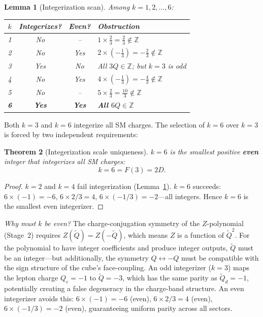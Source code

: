 \documentclass[11pt,a4paper]{article}
\newtheorem{theorem}{Theorem}[section]
\newtheorem{lemma}[theorem]{Lemma}
\theoremstyle{definition}
\theoremstyle{remark}
\newcommand{\tildeQ}{\tilde{Q}}
\newcommand{\Zidx}{Z}
\begin{document}
\begin{lemma}[Integerization scan]
\label{lem:int_scan}
Among $k = 1, 2, \ldots, 6$:
\begin{center}
\begin{tabular}{cccl}
\toprule
$k$ & Integerizes? & Even? & Obstruction \\
\midrule
1 & No & -- & $1 \times \tfrac{2}{3} = \tfrac{2}{3} \notin \mathbb{Z}$ \\
2 & No & Yes & $2 \times (-\tfrac{1}{3}) = -\tfrac{2}{3} \notin \mathbb{Z}$ \\
3 & Yes & No & All $3Q \in \mathbb{Z}$; but $k = 3$ is odd \\
4 & No & Yes & $4 \times (-\tfrac{1}{3}) = -\tfrac{4}{3} \notin \mathbb{Z}$ \\
5 & No & -- & $5 \times \tfrac{2}{3} = \tfrac{10}{3} \notin \mathbb{Z}$ \\
\textbf{6} & \textbf{Yes} & \textbf{Yes} & \textbf{All $6Q \in \mathbb{Z}$} \\
\bottomrule
\end{tabular}
\end{center}
\end{lemma}

\noindent
Both $k = 3$ and $k = 6$ integerize all SM charges.  The selection of $k = 6$
over $k = 3$ is forced by two independent requirements:

\begin{theorem}[Integerization scale uniqueness]
\label{thm:k_eq_6}
$k = 6$ is the smallest positive \textbf{even} integer that integerizes all SM
charges:
\begin{equation}
  \boxed{k = 6 = F(3) = 2D.}
  \label{eq:k_eq_6}
\end{equation}
\end{theorem}

\begin{proof}
$k = 2$ and $k = 4$ fail integerization (Lemma~\ref{lem:int_scan}).
$k = 6$ succeeds: $6 \times (-1) = -6$, $6 \times 2/3 = 4$,
$6 \times (-1/3) = -2$---all integers.
Hence $k = 6$ is the smallest even integerizer.
\end{proof}

\noindent\textit{Why must $k$ be even?}\quad
The charge-conjugation symmetry of the $\Zidx$-polynomial (Stage~2)
requires $\Zidx(\tildeQ) = \Zidx(-\tildeQ)$, which means $\Zidx$ is a
function of $\tildeQ^2$.  For the polynomial to have integer coefficients and
produce integer outputs, $\tildeQ$ must be an integer---but additionally, the
symmetry $Q \leftrightarrow -Q$ must be compatible with the sign structure
of the cube's face-coupling.  An odd integerizer ($k = 3$) maps the lepton
charge $Q_e = -1$ to $\tildeQ = -3$, which has the same parity as
$\tildeQ_d = -1$, potentially creating a false degeneracy in the charge-band
structure.  An even integerizer avoids this: $6 \times (-1) = -6$ (even),
$6 \times 2/3 = 4$ (even), $6 \times (-1/3) = -2$ (even), guaranteeing
uniform parity across all sectors.
\end{document}
